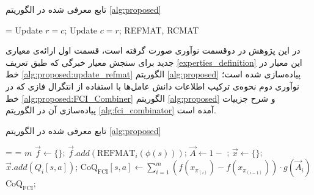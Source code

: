 \begin{algorithm}[t]
\caption{تابع  معرفی شده در الگوریتم \ref{alg:proposed}}\label{alg:swap_func}
\begin{latin}
\begin{algorithmic}[1]
\Require {} = 
			\State Update $r = c$;
		\Else
			\State Update $c = r$;
		\EndIf
	\EndFor
	\State \Return REFMAT, RCMAT
\EndProcedure
\end{algorithmic}
\end{latin}
\end{algorithm}

در این پژوهش در دوقسمت نوآوری صورت گرفته است، قسمت اول ارائه‌ی معیاری جدید برای سنجش معیار خبرگی که طبق تعریف
\ref{experties_definition}
این معیار در خط
\ref{alg:proposed:update_refmat}
الگوریتم
\ref{alg:proposed}
پیاده‌سازی شده است؛ نوآوری دوم نحوه‌ی ترکیب اطلاعات دانش عامل‌ها با استفاده از انتگرال فازی که در خط
\ref{alg:proposed:FCI_Combiner}
الگوریتم
\ref{alg:proposed}
و شرح جزییات پیاده‌سازی آن در الگوریتم
\ref{alg:fci_combinator}
آمده است.

\begin{algorithm}[t]
\caption{تابع  معرفی شده در الگوریتم \ref{alg:proposed}}\label{alg:fci_combinator}
\begin{latin}
\begin{algorithmic}[1]
\Require {} =  = $m$
	 \label{alg:fci_combinator:line:foreach:state}
		\State $\vec{f} \gets \{\}$; 
		\label{alg:fci_combinator:line:refmat:foreach}
			\State $\vec{f}.add(\text{REFMAT}_i(\phi(s)))$;\label{alg:fci_combinator:line:refmat:foreach:loop}
		\EndFor
		\State $\vec{A} \gets 1 - $ ; \label{alg:fci_combinator:line:normalize}
		 \label{alg:fci_combinator:line:fci:foreach:state_action}
			\State $\vec{x} \gets \{\}$; 
			 \label{alg:fci_combinator:line:fci:foreach:state_action:x}
				\State $\vec{x}.add(Q_i[s, a])$;\label{alg:fci_combinator:line:fci:foreach:state_action:x:loop}
			\EndFor
			\State $\text{CoQ}_{\text{FCI}}[s, a] \gets \sum_{i = 1}^{m} \left( f(x_{\pi_{(i)}}) - f(x_{\pi_{(i-1)}}) \right) \cdot g(\vec{A}_i)$  \label{alg:fci_combinator:line:fci}
		\EndFor
	\EndFor
\State \Return $\text{CoQ}_{\text{FCI}}$;
\EndProcedure
\end{algorithmic}
\end{latin}
\end{algorithm}

